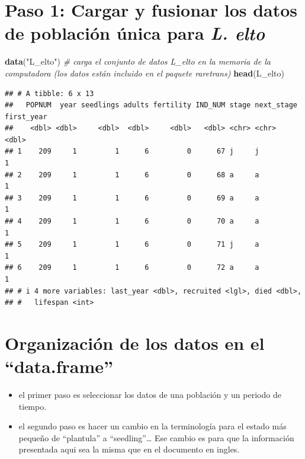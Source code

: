 \documentclass[
]{book}
\newenvironment{Shaded}{\begin{snugshade}}{\end{snugshade}}
\newcommand{\CommentTok}[1]{\textcolor[rgb]{0.56,0.35,0.01}{\textit{#1}}}
\newcommand{\FunctionTok}[1]{\textcolor[rgb]{0.13,0.29,0.53}{\textbf{#1}}}
\newcommand{\NormalTok}[1]{#1}
\newcommand{\StringTok}[1]{\textcolor[rgb]{0.31,0.60,0.02}{#1}}
\providecommand{\tightlist}{%
  \setlength{\itemsep}{0pt}\setlength{\parskip}{0pt}}
\theoremstyle{definition}
\theoremstyle{definition}
\theoremstyle{definition}
\theoremstyle{definition}
\theoremstyle{remark}
\begin{document}
\section{\texorpdfstring{Paso 1: Cargar y fusionar los datos de población única para \emph{L. elto}}{Paso 1: Cargar y fusionar los datos de población única para L. elto}}\label{paso-1-cargar-y-fusionar-los-datos-de-poblaciuxf3n-uxfanica-para-l.-elto}

\begin{Shaded}
\begin{Highlighting}[]
\FunctionTok{data}\NormalTok{(}\StringTok{"L\_elto"}\NormalTok{) }\CommentTok{\# carga el conjunto de datos \textasciigrave{}L\_elto\textasciigrave{} en la memoria de la computadora (los datos están incluido en el paquete \textasciigrave{}raretrans\textasciigrave{})}
\FunctionTok{head}\NormalTok{(L\_elto) }
\end{Highlighting}
\end{Shaded}

\begin{verbatim}
## # A tibble: 6 x 13
##   POPNUM  year seedlings adults fertility IND_NUM stage next_stage first_year
##    <dbl> <dbl>     <dbl>  <dbl>     <dbl>   <dbl> <chr> <chr>           <dbl>
## 1    209     1         1      6         0      67 j     j                   1
## 2    209     1         1      6         0      68 a     a                   1
## 3    209     1         1      6         0      69 a     a                   1
## 4    209     1         1      6         0      70 a     a                   1
## 5    209     1         1      6         0      71 j     a                   1
## 6    209     1         1      6         0      72 a     a                   1
## # i 4 more variables: last_year <dbl>, recruited <lgl>, died <dbl>,
## #   lifespan <int>
\end{verbatim}

\section{Organización de los datos en el ``data.frame''}\label{organizaciuxf3n-de-los-datos-en-el-data.frame}

\begin{itemize}
\tightlist
\item
  el primer paso es seleccionar los datos de una población y un periodo de tiempo.
\item
  el segundo paso es hacer un cambio en la terminología para el estado más pequeño de ``plantula'' a ``seedling''\ldots{} Ese cambio es para que la información presentada aqui sea la misma que en el documento en ingles.
\end{itemize}
\end{document}
